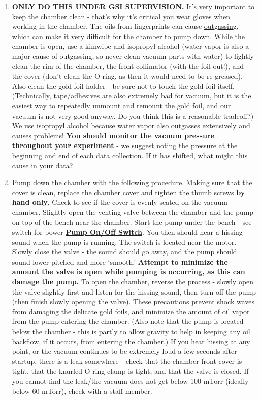 \documentclass{../lab}
\begin{document}
\begin{enumerate}
    \item \textbf{ONLY DO THIS UNDER GSI SUPERVISION.} It's very important to keep the chamber clean - that's why it's critical you wear gloves when working in the chamber. The oils from fingerprints can cause \href{https://en.wikipedia.org/wiki/Outgassing}{outgassing}, which can make it very difficult for the chamber to pump down. While the chamber is open, use a kimwipe and isopropyl alcohol (water vapor is also a major cause of outgassing, so never clean vacuum parts with water) to lightly clean the rim of the chamber, the front collimator (with the foil out!), and the cover (don't clean the O-ring, as then it would need to be re-greased). Also clean the gold foil holder - be sure not to touch the gold foil itself. (Technically, tape/adhesives are also extremely bad for vacuum, but it is the easiest way to repeatedly unmount and remount the gold foil, and our vacuum is not very good anyway. Do you think this is a reasonable tradeoff?) We use isopropyl alcohol because water vapor also outgasses extensively and causes problems! \textbf{You should monitor the vacuum pressure throughout your experiment} - we suggest noting the pressure at the beginning and end of each data collection. If it has shifted, what might this cause in your data?

    \item Pump down the chamber with the following procedure. Making sure that the cover is clean, replace the chamber cover and tighten the thumb screws \textbf{by hand only}. Check to see if the cover is evenly seated on the vacuum chamber. Slightly open the venting valve between the chamber and the pump on top of the bench near the chamber. Start the pump under the bench - see switch for power \href{https://berkeley-physics111b.github.io/assets/pdf/oldwebsitestructure/images/Pump\_Switch\_3535.jpg}{\textbf{Pump On/Off Switch}}. You then should hear a hissing sound when the pump is running. The switch is located near the motor. Slowly close the valve - the sound should go away, and the pump should sound lower pitched and more `smooth.' \textbf{Attempt to minimize the amount the valve is open while pumping is occurring, as this can damage the pump.} To open the chamber, reverse the process - slowly open the valve slightly first and listen for the hissing sound, then turn off the pump (then finish slowly opening the valve). These precautions prevent shock waves from damaging the delicate gold foils, and minimize the amount of oil vapor from the pump entering the chamber. (Also note that the pump is located below the chamber - this is partly to allow gravity to help in keeping any oil backflow, if it occurs, from entering the chamber.) If you hear hissing at any point, or the vacuum continues to be extremely loud a few seconds after startup, there is a leak somewhere - check that the chamber front cover is tight, that the knurled O-ring clamp is tight, and that the valve is closed. If you cannot find the leak/the vacuum does not get below 100 mTorr (ideally below 60 mTorr), check with a staff member.


\end{enumerate}
\end{document}
